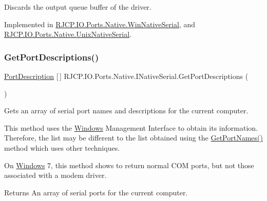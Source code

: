 Discards the output queue buffer of the driver. 



Implemented in \mbox{\hyperlink{class_r_j_c_p_1_1_i_o_1_1_ports_1_1_native_1_1_win_native_serial_a860e9325fe9be729a4cd102d975dc890}{R\+J\+C\+P.\+I\+O.\+Ports.\+Native.\+Win\+Native\+Serial}}, and \mbox{\hyperlink{class_r_j_c_p_1_1_i_o_1_1_ports_1_1_native_1_1_unix_native_serial_a33dccc835ff4a270b598dcadfc7156b0}{R\+J\+C\+P.\+I\+O.\+Ports.\+Native.\+Unix\+Native\+Serial}}.

\mbox{\label{interface_r_j_c_p_1_1_i_o_1_1_ports_1_1_native_1_1_i_native_serial_a7921194ade6a62e4b373cf8faec01c3f}} 
\subsubsection{\texorpdfstring{GetPortDescriptions()}{GetPortDescriptions()}}
{\footnotesize\ttfamily \mbox{\hyperlink{class_r_j_c_p_1_1_i_o_1_1_ports_1_1_port_description}{Port\+Description}} \mbox{[}$\,$\mbox{]} R\+J\+C\+P.\+I\+O.\+Ports.\+Native.\+I\+Native\+Serial.\+Get\+Port\+Descriptions (\begin{DoxyParamCaption}{ }\end{DoxyParamCaption})}



Gets an array of serial port names and descriptions for the current computer. 

This method uses the \mbox{\hyperlink{namespace_r_j_c_p_1_1_i_o_1_1_ports_1_1_native_1_1_windows}{Windows}} Management Interface to obtain its information. Therefore, the list may be different to the list obtained using the \mbox{\hyperlink{interface_r_j_c_p_1_1_i_o_1_1_ports_1_1_native_1_1_i_native_serial_a5c29356160f31a94f992a9a023a78ff3}{Get\+Port\+Names()}} method which uses other techniques. 

On \mbox{\hyperlink{namespace_r_j_c_p_1_1_i_o_1_1_ports_1_1_native_1_1_windows}{Windows}} 7, this method shows to return normal C\+OM ports, but not those associated with a modem driver.

\begin{DoxyReturn}{Returns}
An array of serial ports for the current computer.
\end{DoxyReturn}



